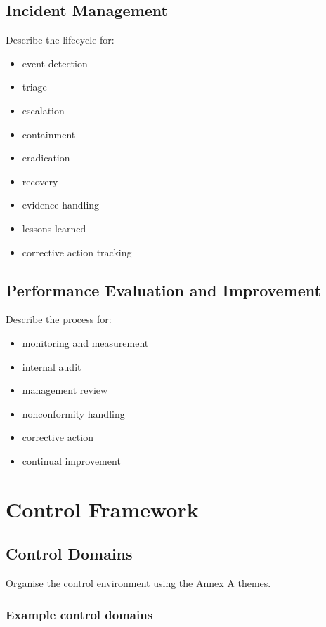 \documentclass[
  letterpaper,
  DIV=11,
  numbers=noendperiod]{scrartcl}
\providecommand{\tightlist}{%
  \setlength{\itemsep}{0pt}\setlength{\parskip}{0pt}}
\begin{document}
\subsection{Incident Management}\label{incident-management}

Describe the lifecycle for:

\begin{itemize}
\tightlist
\item
  event detection
\item
  triage
\item
  escalation
\item
  containment
\item
  eradication
\item
  recovery
\item
  evidence handling
\item
  lessons learned
\item
  corrective action tracking
\end{itemize}

\subsection{Performance Evaluation and
Improvement}\label{performance-evaluation-and-improvement}

Describe the process for:

\begin{itemize}
\tightlist
\item
  monitoring and measurement
\item
  internal audit
\item
  management review
\item
  nonconformity handling
\item
  corrective action
\item
  continual improvement
\end{itemize}

\section{Control Framework}\label{control-framework}

\subsection{Control Domains}\label{control-domains}

Organise the control environment using the Annex A themes.

\subsubsection{Example control domains}\label{example-control-domains}
\end{document}

